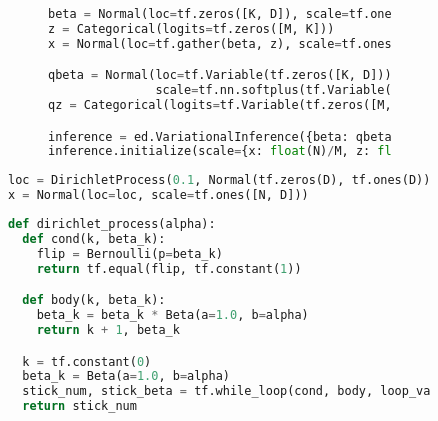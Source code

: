 \documentclass{article} %
\begin{document}
\begin{figure}[t]
\begin{subfigure}{0.3\columnwidth}
  \centering
  
\end{subfigure}%
\begin{subfigure}{0.6\columnwidth}
  \centering
\begin{lstlisting}[language=python]
beta = Normal(loc=tf.zeros([K, D]), scale=tf.ones([K, D]))
z = Categorical(logits=tf.zeros([M, K]))
x = Normal(loc=tf.gather(beta, z), scale=tf.ones([M, D]))

qbeta = Normal(loc=tf.Variable(tf.zeros([K, D])),
               scale=tf.nn.softplus(tf.Variable(tf.zeros([K, D]))))
qz = Categorical(logits=tf.Variable(tf.zeros([M, D])))

inference = ed.VariationalInference({beta: qbeta, z: qz}, data={x: x_batch})
inference.initialize(scale={x: float(N)/M, z: float(N)/M})
\end{lstlisting}
\end{subfigure}
\caption{}
\end{figure}

\begin{figure}[t]
\begin{lstlisting}[language=python]
loc = DirichletProcess(0.1, Normal(tf.zeros(D), tf.ones(D)), sample_shape=N)
x = Normal(loc=loc, scale=tf.ones([N, D]))
\end{lstlisting}

\begin{lstlisting}[language=python]
def dirichlet_process(alpha):
  def cond(k, beta_k):
    flip = Bernoulli(p=beta_k)
    return tf.equal(flip, tf.constant(1))

  def body(k, beta_k):
    beta_k = beta_k * Beta(a=1.0, b=alpha)
    return k + 1, beta_k

  k = tf.constant(0)
  beta_k = Beta(a=1.0, b=alpha)
  stick_num, stick_beta = tf.while_loop(cond, body, loop_vars=[k, beta_k])
  return stick_num
\end{lstlisting}
\caption{}
\end{figure}

% 
% 
\end{document}
